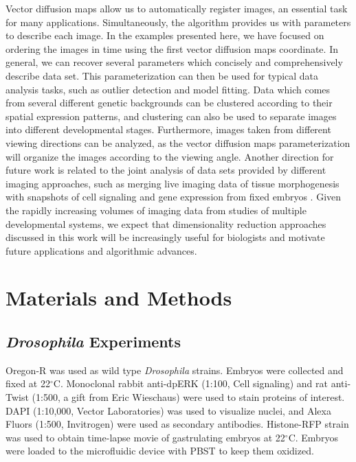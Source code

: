 \documentclass[twocolumn, 10pt]{article}
\begin{document}
Vector diffusion maps allow us to automatically register images, an essential task for many applications.
%
Simultaneously, the algorithm provides us with parameters to describe each image.
%
In the examples presented here, we have focused on ordering the images in time using the first vector diffusion maps coordinate.
%
In general, we can recover several parameters which concisely and comprehensively describe data set.
%
This parameterization can then be used for typical data analysis tasks, such as outlier detection and model fitting.
%
Data which comes from several different genetic backgrounds can be clustered according to their spatial expression patterns, and clustering can also be used to separate images into different developmental stages. 
%
Furthermore, images taken from different viewing directions can be analyzed, as the vector diffusion maps parameterization will organize the images according to the viewing angle.
%
Another direction for future work is related to the joint analysis of data sets provided by different imaging approaches, such as merging live imaging data of tissue morphogenesis with snapshots of cell signaling and gene expression from fixed embryos \citep{krzic2012multiview, ichikawa2014live, rubel2010coupling}.  
%
Given the rapidly increasing volumes of imaging data from studies of multiple developmental systems, we expect that dimensionality reduction approaches discussed in this work will be increasingly useful for biologists and motivate future applications and algorithmic advances. 
  





\section*{Materials and Methods}

\subsection*{{\em Drosophila} Experiments}
%
Oregon-R was used as wild type {\em Drosophila} strains. 
%
Embryos were collected and fixed at 22$^\circ$C. 
%
Monoclonal rabbit anti-dpERK (1:100, Cell signaling) and rat anti-Twist (1:500, a gift from Eric Wieschaus) were used to stain proteins of interest. 
%
DAPI (1:10,000, Vector Laboratories) was used to visualize nuclei, and Alexa Fluors (1:500, Invitrogen) were used as secondary antibodies. 
%
Histone-RFP strain was used to obtain time-lapse movie of gastrulating embryos at 22$^\circ$C. 
%
Embryos were loaded to the microfluidic device with PBST to keep them oxidized. 
\end{document}
